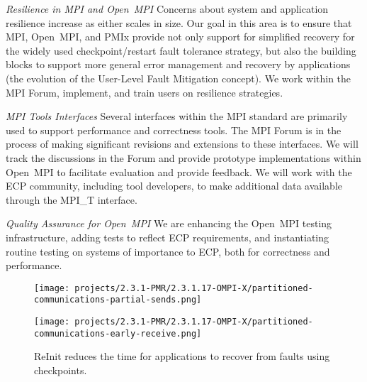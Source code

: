 \emph{Resilience in MPI and Open~MPI} Concerns about system and
application resilience increase as either scales in size.  Our goal in
this area is to ensure that MPI, Open~MPI, and PMIx provide not only
support for simplified
recovery for the widely used checkpoint/restart fault tolerance strategy, but also the building
blocks to support more general error management and recovery by applications (the evolution of the User-Level
Fault Mitigation concept). We work within the MPI Forum, implement,
and train users on resilience strategies.

\emph{MPI Tools Interfaces}  Several interfaces within the
MPI standard are primarily used to support performance and
correctness tools.
The MPI Forum is in the process
of making significant revisions and extensions to these interfaces.
We will track the discussions in the Forum and provide prototype
implementations within Open~MPI to facilitate evaluation and provide
feedback.
We will work with the
ECP community, including tool developers, to make additional data
available through the MPI\_T interface.

\emph{Quality Assurance for Open~MPI}  We are enhancing the
Open~MPI testing infrastructure, adding tests to reflect ECP
requirements, and instantiating routine testing on systems of
importance to ECP, both for correctness and performance.

\begin{figure}
\centering
\begin{minipage}[c]{0.20\textwidth}
\captionsetup{width=\textwidth,font=small,labelfont=bf} %
\caption{ReInit reduces the time for applications to recover from faults using checkpoints.}
\label{fig:partitioned-communications}
\end{minipage}
\qquad
\begin{minipage}[c]{0.20\textwidth}
\texttt{[image: projects/2.3.1-PMR/2.3.1.17-OMPI-X/partitioned-communications-partial-sends.png]}
\end{minipage}
\qquad
\begin{minipage}[c]{0.33\textwidth}
\texttt{[image: projects/2.3.1-PMR/2.3.1.17-OMPI-X/partitioned-communications-early-receive.png]}
\end{minipage}
\end{figure}

